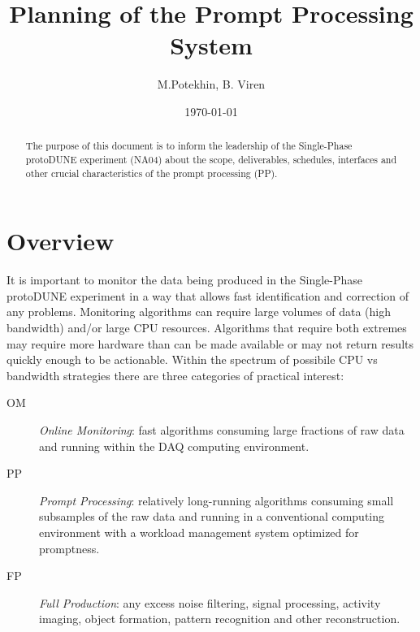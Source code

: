 \documentclass[pdftex,12pt,letter]{article}
\title{Planning of the \pd Prompt Processing System}
\date{\today}
\author{M.Potekhin, B. Viren}
\newcommand{\pd}{protoDUNE\xspace}
\begin{document}

\maketitle

\begin{abstract}
  \noindent The purpose of this document is to inform the leadership
  of the Single-Phase \pd experiment (NA04) about the scope,
  deliverables, schedules, interfaces and other crucial
  characteristics of the prompt processing (PP).
\end{abstract}

\tableofcontents

\pagebreak

\section{Overview}
It is important to monitor the data being produced in the Single-Phase
\pd experiment in a way that allows fast identification and correction
of any problems.  Monitoring algorithms can require large volumes of
data (high bandwidth) and/or large CPU resources.  Algorithms that require both extremes
may require more hardware than can be made available or may not return results quickly
enough to be actionable.
Within the spectrum of possibile CPU vs bandwidth strategies there are three categories
of practical interest:

\begin{description}

\item[OM] \textit{Online Monitoring}: fast algorithms consuming large fractions of raw data and running
within the DAQ computing environment.

\item[PP] \textit{Prompt Processing}: relatively long-running algorithms consuming small subsamples of the raw data and running in a conventional computing environment with a workload management system optimized for promptness.

\item[FP] \textit{Full Production}: any excess noise filtering, signal processing, activity imaging, object formation, pattern recognition and other reconstruction.

\end{description}
\end{document}
